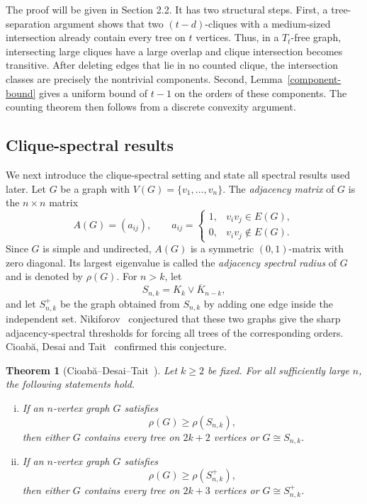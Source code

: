 \documentclass[11pt,a4paper]{article}
\newtheorem{theorem}{Theorem}[section]
\begin{document}
The proof will be given in Section 2.2. It  has two structural steps. First, a tree-separation argument shows that two \((t-d)\)-cliques with a medium-sized intersection already contain every tree on \(t\) vertices. Thus, in a \(T_t\)-free graph, intersecting large cliques have a large overlap and clique intersection becomes transitive. After deleting edges that lie in no counted clique, the intersection classes are precisely the nontrivial components. Second, Lemma~\ref{component-bound} gives a uniform bound of \(t-1\) on the orders of these components. The counting theorem then follows from a discrete convexity argument.

\subsection{Clique-spectral results}\label{spectral-results}

We next introduce the clique-spectral setting and state all spectral results used later. Let $G$ be a graph with $V(G)=\{v_1,\ldots,v_n\}$. The \emph{adjacency matrix} of $G$ is the $n\times n$ matrix
\[
A(G)=(a_{ij}),
\qquad
a_{ij}=\begin{cases}
1,& v_iv_j\in E(G),\\
0,& v_iv_j\notin E(G).
\end{cases}
\]
Since $G$ is simple and undirected, $A(G)$ is a symmetric $(0,1)$-matrix with zero diagonal. Its largest eigenvalue is called the \emph{adjacency spectral radius} of $G$ and is denoted by $\rho(G)$.   For $n>k$, let
\[
S_{n,k}=K_k\vee \overline{K}_{n-k},
\]
and let $S_{n,k}^{+}$ be the graph obtained from $S_{n,k}$ by adding one edge inside the independent set. Nikiforov~\cite{Nikiforov2010paths} conjectured that these two graphs give the sharp adjacency-spectral thresholds for forcing all trees of the corresponding orders. Cioab\u{a}, Desai and Tait~\cite{CioabaDesaiTait2023} confirmed this conjecture.

\begin{theorem}[Cioab\u{a}--Desai--Tait~\cite{CioabaDesaiTait2023}]\label{CDT-spectral-Erdos-Sos}
Let $k\ge2$ be fixed. For all sufficiently large $n$, the following statements hold.
\begin{enumerate}[(i)]
\item If an $n$-vertex graph $G$ satisfies
\[
\rho(G)\ge \rho(S_{n,k}),
\]
then either $G$ contains every tree on $2k+2$ vertices or $G\cong S_{n,k}$.
\item If an $n$-vertex graph $G$ satisfies
\[
\rho(G)\ge \rho(S_{n,k}^{+}),
\]
then either $G$ contains every tree on $2k+3$ vertices or $G\cong S_{n,k}^{+}$.
\end{enumerate}
\end{theorem}
\end{document}
